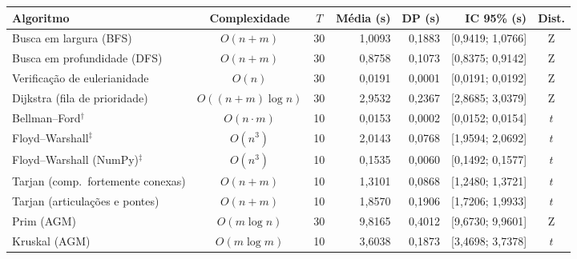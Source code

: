 \begin{tabular}{lccrrrc}
\hline
\textbf{Algoritmo} & \textbf{Complexidade} & $T$ & \textbf{Média (s)} & \textbf{DP (s)} & \textbf{IC 95\% (s)} & \textbf{Dist.} \\ \hline
Busca em largura (BFS) & $O(n+m)$ & 30 & 1,0093 & 0,1883 & [0,9419; 1,0766] & Z \\
Busca em profundidade (DFS) & $O(n+m)$ & 30 & 0,8758 & 0,1073 & [0,8375; 0,9142] & Z \\
Verificação de eulerianidade & $O(n)$ & 30 & 0,0191 & 0,0001 & [0,0191; 0,0192] & Z \\
Dijkstra (fila de prioridade) & $O((n+m)\log n)$ & 30 & 2,9532 & 0,2367 & [2,8685; 3,0379] & Z \\
Bellman--Ford$^{\dagger}$ & $O(n\cdot m)$ & 10 & 0,0153 & 0,0002 & [0,0152; 0,0154] & $t$ \\
Floyd--Warshall$^{\ddagger}$ & $O(n^3)$ & 10 & 2,0143 & 0,0768 & [1,9594; 2,0692] & $t$ \\
Floyd--Warshall (NumPy)$^{\ddagger}$ & $O(n^3)$ & 10 & 0,1535 & 0,0060 & [0,1492; 0,1577] & $t$ \\
Tarjan (comp.\ fortemente conexas) & $O(n+m)$ & 10 & 1,3101 & 0,0868 & [1,2480; 1,3721] & $t$ \\
Tarjan (articulações e pontes) & $O(n+m)$ & 10 & 1,8570 & 0,1906 & [1,7206; 1,9933] & $t$ \\
Prim (AGM) & $O(m\log n)$ & 30 & 9,8165 & 0,4012 & [9,6730; 9,9601] & Z \\
Kruskal (AGM) & $O(m\log m)$ & 10 & 3,6038 & 0,1873 & [3,4698; 3,7378] & $t$ \\
\hline
\end{tabular}
